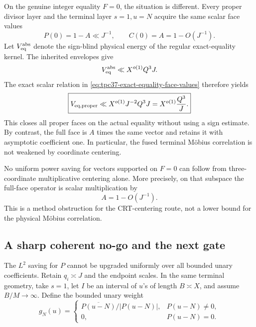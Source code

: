 On the genuine integer equality \(F=0\), the situation is different.
Every proper divisor layer and the terminal layer \(s=1,u=N\) acquire the
same scalar face values
\begin{equation}
 P(0)=1-A\ll J^{-1},
 \qquad C(0)=A=1-O(J^{-1}).
 \label{eq:tpc37-exact-equality-face-values}
\end{equation}
Let \(V_{\rm eq}^{\rm abs}\) denote the sign-blind physical energy of the
regular exact-equality kernel.  The inherited envelopes give
\begin{equation}
 V_{\rm eq}^{\rm abs}\ll X^{o(1)}Q^3J.
 \label{eq:tpc37-equality-absolute-baseline}
\end{equation}
The exact scalar relation in
\eqref{eq:tpc37-exact-equality-face-values} therefore yields
\begin{equation}
 \boxed{
 V_{{\rm eq},{\rm proper}}
 \ll X^{o(1)}J^{-2}Q^3J
 =X^{o(1)}\frac{Q^3}{J}.}
 \label{eq:tpc37-equality-proper-closure}
\end{equation}
This closes all proper faces on the actual equality without using a sign
estimate.  By contrast, the full face is \(A\) times the same vector and
retains it with asymptotic coefficient one.  In particular, the fused
terminal M\"obius correlation is not weakened by coordinate centering.

\begin{corollary}
\label{cor:tpc37-full-face-obstruction}
No uniform power saving for vectors supported on \(F=0\) can follow from
three-coordinate multiplicative centering alone.  More precisely, on
that subspace the full-face operator is scalar multiplication by
\begin{equation}
 A=1-O(J^{-1}).
 \label{eq:tpc37-full-face-scalar}
\end{equation}
This is a method obstruction for the CRT-centering route, not a lower
bound for the physical M\"obius correlation.
\end{corollary}

\subsection{A sharp coherent no-go and the next gate}

The \(L^2\) saving for \(P\) cannot be upgraded uniformly over all
bounded unary coefficients.  Retain \(q_i\asymp J\) and the endpoint
scales.  In the same terminal geometry, take \(s=1\), let \(I\) be an
interval of \(u\)'s of length \(B\asymp X\), and assume \(B/M\to\infty\).
Define the bounded unary weight
\begin{equation}
 g_N(u)=
 \begin{cases}
  \overline{P(u-N)}/|P(u-N)|,&P(u-N)\ne0,\\
  0,&P(u-N)=0.
 \end{cases}
 \label{eq:tpc37-coherent-saturating-weight}
\end{equation}

